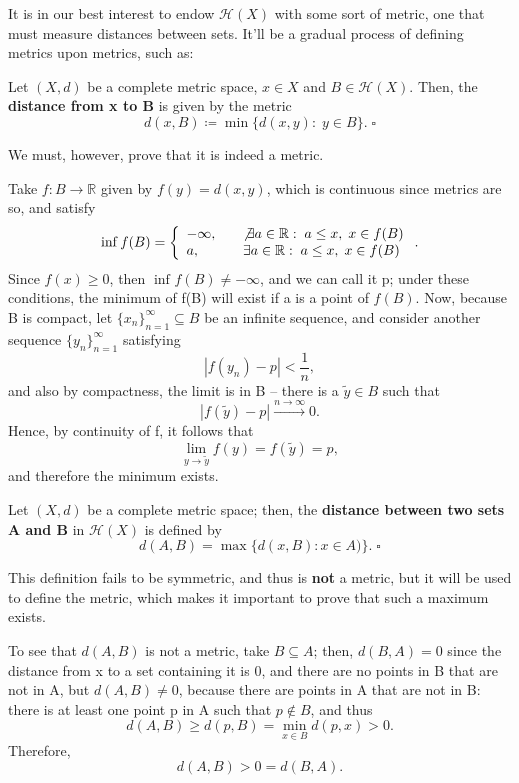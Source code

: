 \documentclass[../fractals_everywhere.tex]{subfiles}
\begin{document}
It is in our best interest to endow \(\mathcal{H}(X)\) with some sort of metric, one that must measure distances between sets. It'll be a gradual process of defining metrics upon metrics, such as:
\begin{def*}
	Let \((X, d)\) be a complete metric space, \(x\in X\) and \(B\in \mathcal{H}(X)\). Then, the \textbf{distance from x to B} is given by the metric
	\[
		d(x, B)\coloneqq \min\limits_{}\{d(x, y):\; y\in B\}.\; \square
	\]
\end{def*}
We must, however, prove that it is indeed a metric.

Take \(f:B\rightarrow \mathbb{R}\) given by \(f(y) = d(x, y)\), which is continuous since metrics are so, and satisfy
\[
	\inf_{}f(B)  = \left\{\begin{array}{ll}
		-\infty, \quad & \not\exists a\in \mathbb{R}:\; a\leq x,\; x\in f(B) \\
		a, \quad       & \exists a\in \mathbb{R}:\; a\leq x,\; x\in f(B)
	\end{array}\right..
\]
Since \(f(x)\geq 0\), then \(\inf_{}f(B)\neq -\infty\), and we can call it p; under these conditions, the minimum of f(B) will exist if a is a point of \(f(B)\).
Now, because B is compact, let \(\{x_{n}\}_{n=1}^{\infty}\subseteq B\) be an infinite sequence, and consider another sequence \(\{y_{n}\}_{n=1}^{\infty}\) satisfying
\[
	| f(y_{n})-p |<\frac{1}{n},
\]
and also by compactness, the limit is in B -- there is a \(\tilde{y}\in B\) such that
\[
	| f(\tilde{y})-p | \stackrel{n\to \infty}\rightarrow 0.
\]
Hence, by continuity of f, it follows that
\[
	\lim_{y\to \tilde{y}}f(y) = f(\tilde{y}) = p,
\]
and therefore the minimum exists.
\begin{def*}
	Let \((X, d)\) be a complete metric space; then, the \textbf{distance between two sets A and B} in \(\mathcal{H}(X)\) is defined by
	\[
		d(A, B) = \max\limits_{}\{d(x, B): x\in A)\}.\; \square
	\]
\end{def*}
This definition fails to be symmetric, and thus is \textbf{not} a metric, but it will be used to define the metric, which makes it important to prove that such a maximum exists.

\begin{example}
	To see that \(d(A, B)\) is not a metric, take \(B\subseteq A\); then, \(d(B, A) = 0\) since the distance from x to a set containing it is 0, and there are no points in B that are not in A, but \(d(A, B) \neq 0\), because there are points in A that are not in B: there is at least one point p in A such that \(p\not\in B\), and thus
	\[
		d(A, B) \geq d(p, B) = \min\limits_{x\in B}d(p, x) > 0.
	\]
	Therefore,
	\[
		d(A, B) > 0 = d(B, A).
	\]
\end{example}
\end{document}
